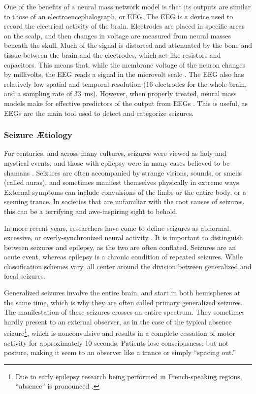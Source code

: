 One of the benefits of a neural mass network model is that its outputs are similar to those of an electroencephalograph, or EEG.
The EEG is a device used to record the electrical activity of the brain.
Electrodes are placed in specific areas on the scalp, and then changes in voltage are measured from neural masses beneath the skull.
Much of the signal is distorted and attenuated by the bone and tissue between the brain and the electrodes, which act like resistors and capacitors.
This means that, while the membrane voltage of the neuron changes by millivolts, the EEG reads a signal in the microvolt scale \cite{Kandel2013}.
The EEG also has relatively low spatial and temporal resolution (16 electrodes for the whole brain, and a sampling rate of \SI{33}{\ms}).
However, when properly treated, neural mass models make for effective predictors of the output from EEGs \cite{Taylor2012,Leistritz2007}.
This is useful, as EEGs are the main tool used to detect and categorize seizures.

\subsubsection{Seizure \AE tiology}
\label{sec:intro_seizures_aetiology}
For centuries, and across many cultures, seizures were viewed as holy and mystical events, and those with epilepsy were in many cases believed to be shamans \cite{Kandel2013,Fadiman1998}.
Seizures are often accompanied by strange visions, sounds, or smells (called auras), and sometimes manifest themselves physically in extreme ways.
External symptoms can include convulsions of the limbs or the entire body, or a seeming trance.
In societies that are unfamiliar with the root causes of seizures, this can be a terrifying and awe-inspiring sight to behold.

In more recent years, researchers have come to define seizures as abnormal, excessive, or overly-synchronized neural activity \cite{Kandel2013,Baier2012}.
It is important to distinguish between seizures and epilepsy, as the two are often conflated.
Seizures are an acute event, whereas epilepsy is a chronic condition of repeated seizures.
While classification schemes vary, all center around the division between generalized and focal seizures.

Generalized seizures involve the entire brain, and start in both hemispheres at the same time, which is why they are often called primary generalized seizures.
The manifestation of these seizures crosses an entire spectrum.
They sometimes hardly present to an external observer, as in the case of the typical absence seizure\footnote{Due to early epilepsy research being performed in French-speaking regions, ``absence'' is pronounced .}, which is nonconvulsive and results in a complete cessation of motor activity for approximately 10 seconds.
Patients lose consciousness, but not posture, making it seem to an observer like a trance or simply ``spacing out.''

